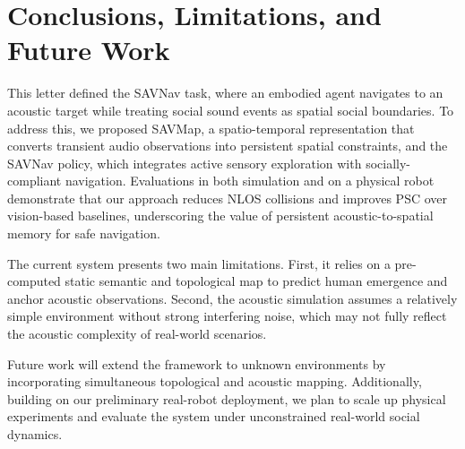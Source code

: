 \section{Conclusions, Limitations, and Future Work}
\label{sec:conclusions}

This letter defined the SAVNav task, where an embodied agent navigates to an acoustic target while treating social sound events as spatial social boundaries. To address this, we proposed SAVMap, a spatio-temporal representation that converts transient audio observations into persistent spatial constraints, and the SAVNav policy, which integrates active sensory exploration with socially-compliant navigation. Evaluations in both simulation and on a physical robot demonstrate that our approach reduces NLOS collisions and improves PSC over vision-based baselines, underscoring the value of persistent acoustic-to-spatial memory for safe navigation.

The current system presents two main limitations. First, it relies on a pre-computed static semantic and topological map to predict human emergence and anchor acoustic observations. Second, the acoustic simulation assumes a relatively simple environment without strong interfering noise, which may not fully reflect the acoustic complexity of real-world scenarios.

Future work will extend the framework to unknown environments by incorporating simultaneous topological and acoustic mapping. Additionally, building on our preliminary real-robot deployment, we plan to scale up physical experiments and evaluate the system under unconstrained real-world social dynamics.
